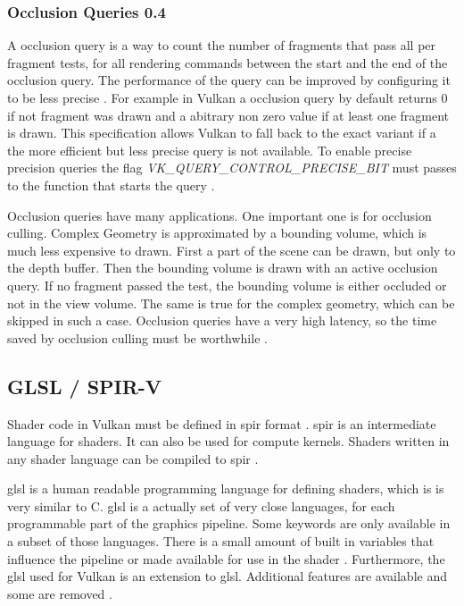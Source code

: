 \subsubsection{Occlusion Queries 0.4}
A occlusion query is a way to count the number of fragments that pass all per fragment tests, for all rendering commands between the start and the end of the occlusion query. The performance of the query can be improved by configuring it to be less precise \cite{akine:2018:realtime}. For example in Vulkan a occlusion query by default returns 0 if not fragment was drawn and a abitrary non zero value if at least one fragment is drawn. This specification allows Vulkan to fall back to the exact variant if a the more efficient but less precise query is not available. To enable precise precision queries the flag \textit{VK\_QUERY\_CONTROL\_PRECISE\_BIT} must passes to the function that starts the query \cite{khronos:vulkan:spec1.1}.

Occlusion queries have many applications. One important one is for occlusion culling. Complex Geometry is approximated by a bounding volume, which is much less expensive to drawn. First a part of the scene can be drawn, but only to the depth buffer. Then the bounding volume is drawn with an active occlusion query. If no fragment passed the test, the bounding volume is either occluded or not in the view volume. The same is true for the complex geometry, which can be skipped in such a case. Occlusion queries have a very high latency, so the time saved by occlusion culling must be worthwhile \cite{akine:2018:realtime, sellers:vulkanprogramming}.


\subsection{GLSL / SPIR-V}

Shader code in Vulkan must be defined in \gls{spir} format \cite{khronos:vulkan:spec1.1}. \Gls{spir} is an intermediate language for shaders. It can also be used for compute kernels. Shaders written in any shader language can be compiled to \gls{spir} \cite{kessenich:2018:spir}.

\Gls{glsl} is a human readable programming language for defining shaders, which is is very similar to C. \Gls{glsl} is a actually set of very close languages, for each programmable part of the graphics pipeline. Some keywords are only available in a subset of those languages. There is a small amount of built in variables that influence the pipeline or made available for use in the shader \cite{khronos:glsl4.60:spec}. Furthermore, the \gls{glsl} used for Vulkan is an extension to \gls{glsl}. Additional features are available and some are removed \cite{khronos:vulkan:glsl}.

